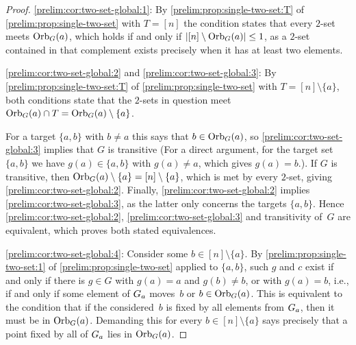 \begin{proof}
	\ref{prelim:cor:two-set-global:1}: By
	\cref{prelim:prop:single-two-set:T} of \cref{prelim:prop:single-two-set} with $T = [n]$ the condition
	states that every $2$-set meets $\Orbit{a}{G}$, which holds if and only if
	$|[n] \setminus \Orbit{a}{G}| \le 1$, as a $2$-set contained in that complement exists
	precisely when it has at least two elements.	
	
	\ref{prelim:cor:two-set-global:2} and \ref{prelim:cor:two-set-global:3}: By
	\cref{prelim:prop:single-two-set:T} of \cref{prelim:prop:single-two-set} with
	$T = [n] \setminus \{a\}$, both conditions state that the $2$-sets in question meet
	$\Orbit{a}{G} \cap T = \Orbit{a}{G} \setminus \{a\}$.
	
	For a target $\{a,b\}$ with $b \ne a$ this says that $b \in \Orbit{a}{G}$, so
	\cref{prelim:cor:two-set-global:3} implies that $G$ is transitive (For a direct argument,
	for the target set $\{a,b\}$
    we have $g(a) \in \{a,b\}$ with $g(a) \ne a$, which gives $g(a) = b$.).
	If $G$ is transitive, then $\Orbit{a}{G} \setminus \{a\} = [n] \setminus \{a\}$, which is met
	by every $2$-set, giving \cref{prelim:cor:two-set-global:2}.
	Finally, \cref{prelim:cor:two-set-global:2} implies \cref{prelim:cor:two-set-global:3}, as the
	latter only concerns the targets $\{a,b\}$.
	Hence \cref{prelim:cor:two-set-global:2}, \cref{prelim:cor:two-set-global:3} and transitivity
	of~$G$ are equivalent, which proves both stated equivalences.
		
	\ref{prelim:cor:two-set-global:4}: Consider some $b \in [n] \setminus\{a\}$. By
	\cref{prelim:prop:single-two-set:1} of \cref{prelim:prop:single-two-set} applied to $\{a,b\}$,
	such $g$ and $c$ exist if and only if there is $g \in G$ with $g(a) = a$ and $g(b) \ne b$,
	or with $g(a) = b$, i.e., if and only if some element of $\Stab{a}{G}$ moves~$b$ or
	$b \in \Orbit{a}{G}$.
	This is equivalent to the condition that if the considered~$b$
	is fixed by all elements from $\Stab{a}{G}$,
	then it must be in $\Orbit{a}{G}$.
	Demanding this for every $b \in [n] \setminus \{a\}$ says precisely that a point fixed by
	all of $\Stab{a}{G}$ lies in $\Orbit{a}{G}$.
\end{proof}

